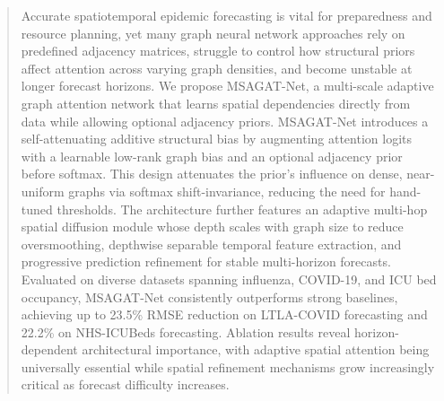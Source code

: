 \documentclass[final,1p,times]{elsarticle}
\begin{document}
\begin{frontmatter}

\begin{abstract}
Accurate spatiotemporal epidemic forecasting is vital for preparedness and resource planning, yet many graph neural network approaches rely on predefined adjacency matrices, struggle to control how structural priors affect attention across varying graph densities, and become unstable at longer forecast horizons. We propose MSAGAT-Net, a multi-scale adaptive graph attention network that learns spatial dependencies directly from data while allowing optional adjacency priors. MSAGAT-Net introduces a self-attenuating additive structural bias by augmenting attention logits with a learnable low-rank graph bias and an optional adjacency prior before softmax. This design attenuates the prior’s influence on dense, near-uniform graphs via softmax shift-invariance, reducing the need for hand-tuned thresholds. The architecture further features an adaptive multi-hop spatial diffusion module whose depth scales with graph size to reduce oversmoothing, depthwise separable temporal feature extraction, and progressive prediction refinement for stable multi-horizon forecasts. Evaluated on diverse datasets spanning influenza, COVID-19, and ICU bed occupancy, MSAGAT-Net consistently outperforms strong baselines, achieving up to 23.5\% RMSE reduction on LTLA-COVID forecasting and 22.2\% on NHS-ICUBeds forecasting. Ablation results reveal horizon-dependent architectural importance, with adaptive spatial attention being universally essential while spatial refinement mechanisms grow increasingly critical as forecast difficulty increases.
\end{abstract}



\end{frontmatter}
\end{document}
